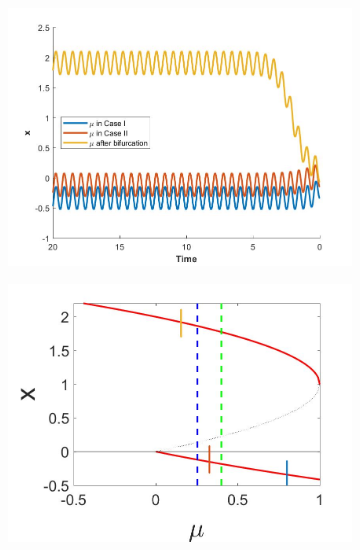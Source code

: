 \begin{figure}[H]
\centering
\begin{subfigure}{.5\textwidth}
  \centering
  \includegraphics[width=\linewidth]{oneD/osc_timeseries.jpg}
  \caption{}
\end{subfigure}%
\begin{subfigure}{.5\textwidth}
  \centering
  \includegraphics[width=\linewidth]{oneD/osc_bif_diagram.jpg}
  \caption{}
\end{subfigure}
\begin{subfigure}{.5\textwidth}
  \centering

\end{subfigure}
\end{figure}
